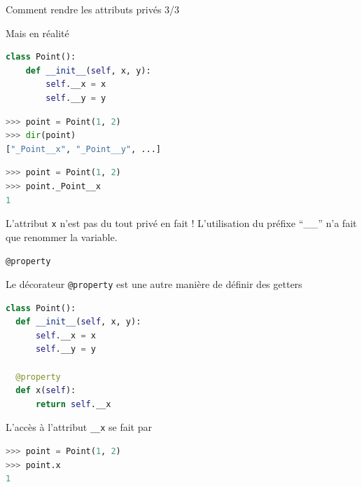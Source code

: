 \documentclass[10pt]{beamer}
\begin{document}
\begin{frame}[fragile]{Comment rendre les attributs privés 3/3}

  Mais en réalité
  \begin{lstlisting}[language=Python, numbers=none]
class Point():
    def __init__(self, x, y):
        self.__x = x
        self.__y = y
\end{lstlisting}

  \begin{overprint}

\begin{lstlisting}[language=Python, numbers=none]
>>> point = Point(1, 2)
>>> dir(point)
["_Point__x", "_Point__y", ...]
\end{lstlisting}

\begin{lstlisting}[language=Python, numbers=none]
>>> point = Point(1, 2)
>>> point._Point__x
1
\end{lstlisting}
  L'attribut \texttt{x} n'est pas du tout privé en fait !
  L'utilisation du préfixe ``\_\_'' n'a fait que renommer la variable.
  \end{overprint}

  \end{frame}



\begin{frame}[fragile]{\texttt{@property}}

  Le décorateur \texttt{@property} est une autre manière de définir des getters
  
\begin{lstlisting}[language=Python, numbers=none]
class Point():
  def __init__(self, x, y):
      self.__x = x
      self.__y = y

  @property
  def x(self):
      return self.__x
\end{lstlisting}

L'accès à l'attribut \texttt{\_\_x} se fait par 

\begin{lstlisting}[language=Python, numbers=none]
>>> point = Point(1, 2)
>>> point.x
1
\end{lstlisting}
\end{frame}



\end{document}
